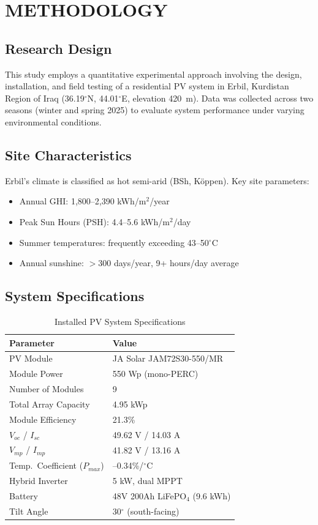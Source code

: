 \chapter{METHODOLOGY}

\section{Research Design}

This study employs a quantitative experimental approach involving the design, installation, and field testing of a residential PV system in Erbil, Kurdistan Region of Iraq (36.19$^{\circ}$N, 44.01$^{\circ}$E, elevation 420~m). Data was collected across two seasons (winter and spring 2025) to evaluate system performance under varying environmental conditions.


\section{Site Characteristics}

Erbil's climate is classified as hot semi-arid (BSh, K\"{o}ppen). Key site parameters:
\begin{itemize}
    \item Annual GHI: 1,800--2,390 kWh/m$^{2}$/year
    \item Peak Sun Hours (PSH): 4.4--5.6 kWh/m$^{2}$/day
    \item Summer temperatures: frequently exceeding 43--50$^{\circ}$C
    \item Annual sunshine: $>$300 days/year, 9+ hours/day average
\end{itemize}


\section{System Specifications}

\begin{table}[H]
\centering
\caption{Installed PV System Specifications}
\label{tab:short_specs}
\begin{tabular}{@{}l l@{}}
\toprule
\textbf{Parameter} & \textbf{Value} \\
\midrule
PV Module & JA Solar JAM72S30-550/MR \\
Module Power & 550 Wp (mono-PERC) \\
Number of Modules & 9 \\
Total Array Capacity & 4.95 kWp \\
Module Efficiency & 21.3\% \\
$V_{oc}$ / $I_{sc}$ & 49.62 V / 14.03 A \\
$V_{mp}$ / $I_{mp}$ & 41.82 V / 13.16 A \\
Temp.\ Coefficient ($P_{max}$) & --0.34\%/$^{\circ}$C \\
Hybrid Inverter & 5 kW, dual MPPT \\
Battery & 48V 200Ah LiFePO$_4$ (9.6 kWh) \\
Tilt Angle & 30$^{\circ}$ (south-facing) \\
\bottomrule
\end{tabular}
\end{table}


